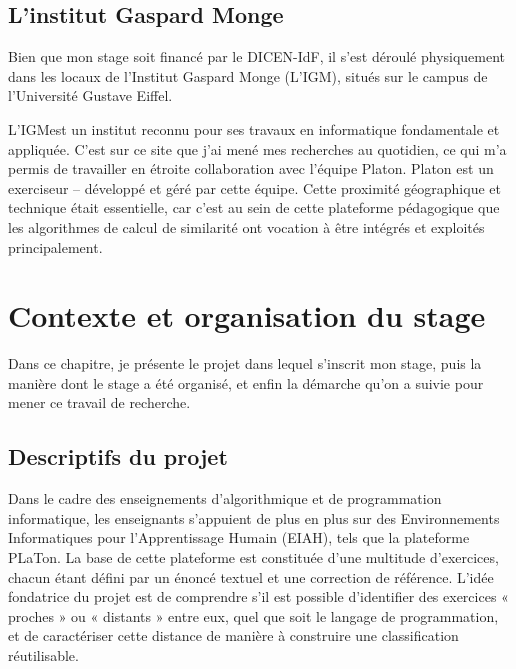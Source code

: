 \documentclass[12pt,a4paper,oneside]{report}
\begin{document}
\section{L'institut Gaspard Monge }

Bien que mon stage soit financé par le DICEN-IdF, il s'est déroulé physiquement
 dans les locaux de l'Institut Gaspard Monge (L'IGM), situés sur le campus de 
 l'Université Gustave Eiffel. 

L'IGMest un institut reconnu pour ses travaux en informatique fondamentale et appliquée. C'est sur ce site que
 j'ai mené mes recherches au quotidien, ce qui m'a permis de travailler en
  étroite collaboration avec l'équipe Platon. Platon est  un exerciseur
   -- développé et géré par cette équipe. Cette proximité 
  géographique et technique était essentielle, car c'est au sein de cette
   plateforme pédagogique que les algorithmes de calcul de similarité ont vocation à être intégrés et 
   exploités principalement.



\chapter{ Contexte et organisation du stage }

Dans ce chapitre, je présente le projet dans lequel s'inscrit mon stage,
puis la manière dont le stage a été organisé, et enfin la
démarche qu'on a  suivie pour mener ce travail de recherche.


\section{Descriptifs du projet}


Dans le cadre des enseignements d'algorithmique et de programmation
informatique, les enseignants s'appuient de plus en plus sur des
Environnements Informatiques pour l'Apprentissage Humain (EIAH), tels que
la plateforme PLaTon. La base de cette plateforme est constituée d'une
multitude d'exercices, chacun étant défini par un énoncé textuel et une
correction de référence. L'idée fondatrice du projet est de comprendre s'il
est possible d'identifier des exercices « proches » ou « distants » entre
eux, quel que soit le langage de programmation, et de caractériser cette
distance de manière à construire une classification réutilisable.
\end{document}
